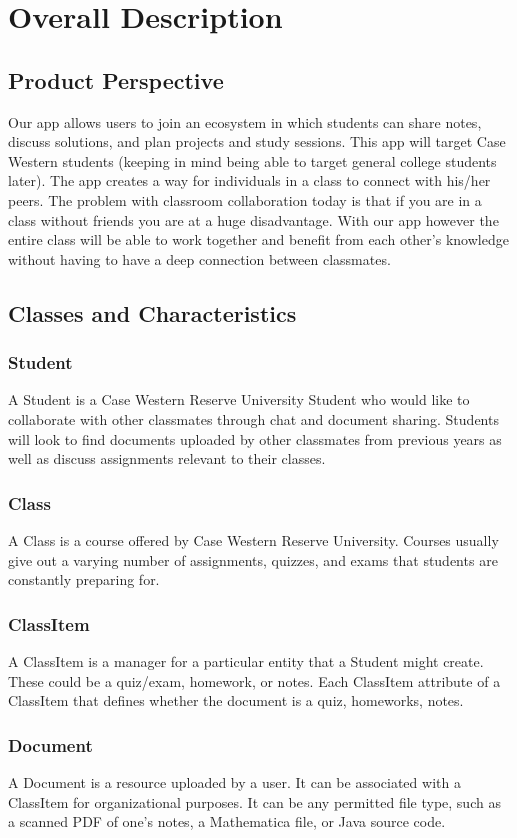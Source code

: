 \documentclass{scrreprt}
\begin{document}
\chapter{Overall Description}
\section{Product Perspective}
Our app allows users to join an ecosystem in which students can share notes, discuss solutions, and plan projects and study sessions. This app will target Case Western students (keeping in mind being able to target general college students later). The app creates a way for individuals in a class to connect with his/her peers. The problem with classroom collaboration today is that if you are in a class without friends you are at a huge disadvantage. With our app however the entire class will be able to work together and benefit from each other’s knowledge without having to have a deep connection between classmates.
\section{Classes and Characteristics}
\subsection{Student}
A Student is a Case Western Reserve University Student who would like to collaborate with other classmates through chat and document sharing. Students will look to find documents uploaded by other classmates from previous years as well as discuss assignments relevant to their classes.
\subsection{Class}
A Class is a course offered by Case Western Reserve University. Courses usually give out a varying number of assignments, quizzes, and exams that students are constantly preparing for.
\subsection{ClassItem}
A ClassItem is a manager for a particular entity that a Student might create. These could be a quiz/exam, homework, or notes. 
Each ClassItem attribute of a ClassItem that defines whether the document is a quiz, homeworks, notes. 
\subsection{Document}
A Document is a resource uploaded by a user. It can be associated with a ClassItem for organizational purposes. It can be any permitted file type, such as a scanned PDF of one’s notes, a Mathematica file, or Java source code. 
\end{document}
